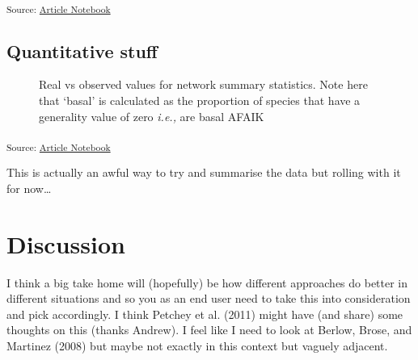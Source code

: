 \documentclass[
  letterpaper,
  DIV=11,
  numbers=noendperiod]{scrartcl}
\begin{document}
\textsubscript{Source:
\href{https://BecksLab.github.io/ms_t_is_for_topology/index.qmd.html}{Article
Notebook}}

\subsection{Quantitative stuff}\label{quantitative-stuff}

\begin{figure}[H]


\caption{\label{fig-topology}Real vs observed values for network summary
statistics. Note here that `basal' is calculated as the proportion of
species that have a generality value of zero \emph{i.e.,} are basal
AFAIK}

\end{figure}%

\textsubscript{Source:
\href{https://BecksLab.github.io/ms_t_is_for_topology/index.qmd.html}{Article
Notebook}}

This is actually an awful way to try and summarise the data but rolling
with it for now\ldots{}

\section{Discussion}\label{discussion}

I think a big take home will (hopefully) be how different approaches do
better in different situations and so you as an end user need to take
this into consideration and pick accordingly. I think Petchey et al.
(2011) might have (and share) some thoughts on this (thanks Andrew). I
feel like I need to look at Berlow, Brose, and Martinez (2008) but maybe
not exactly in this context but vaguely adjacent.
\end{document}

